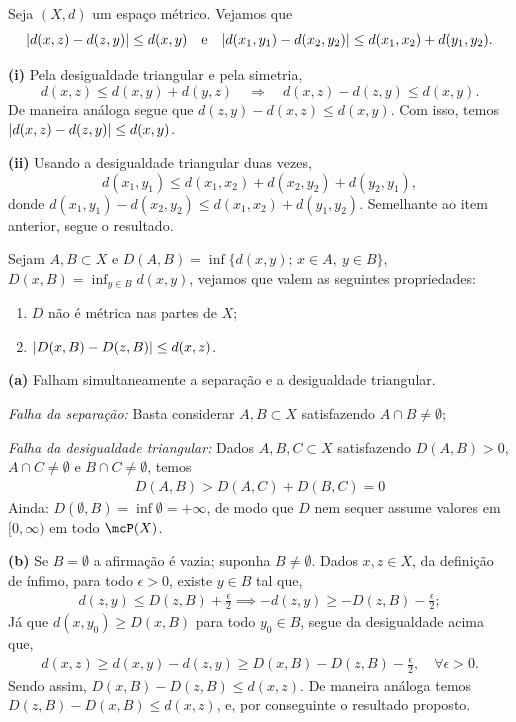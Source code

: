 \vspace{4mm}
\begin{exercicio}{Seja $(X,d)$ um espaço métrico. Vejamos que 
$$\lvert d(x,z)-d(z,y)\rvert\le d(x,y) 
\quad \text{e}\quad \lvert d(x_1,y_1)-d(x_2,y_2)\rvert\le d(x_1,x_2)+d(y_1,y_2).$$}

\textbf{(i)} Pela desigualdade triangular e pela simetria,
\[ d(x,z) \le d(x,y)+d(y,z) \quad\Longrightarrow\quad d(x,z)-d(z,y) \le d(x,y). \]
De maneira análoga segue que $d(z,y)-d(x,z)\le d(x,y)$. Com isso, temos 
$\lvert d(x,z)-d(z,y)\rvert\le d(x,y)$.

\textbf{(ii)} Usando a desigualdade triangular duas vezes,
\[ d(x_1,y_1) \le d(x_1,x_2)+d(x_2,y_2)+d(y_2,y_1), \]
donde $d(x_1,y_1)-d(x_2,y_2)\le d(x_1,x_2)+d(y_1,y_2)$. Semelhante ao item anterior, 
segue o resultado.
\end{exercicio}

\begin{exercicio}{Sejam $A,B\subset X$ e $D(A,B)=\inf\{d(x,y);\, x\in A,\ y\in B\}$, $D(x,B)=\inf_{y\in B} d(x,y)$, vejamos que 
  valem as seguintes propriedades:
  \begin{enumerate}[label=(\alph*)]
  \item $D$ não é métrica nas partes de $X$;
  \item $\lvert D(x,B)-D(z,B)\rvert\le d(x,z)$. 
\end{enumerate}}
\textbf{(a)} Falham simultaneamente a separação e a desigualdade triangular. 

\emph{Falha da separação:} Basta considerar $A, B \subset X$ satisfazendo $A \cap B \neq \emptyset$;

\emph{Falha da desigualdade triangular:} Dados $A, B, C \subset X$ satisfazendo
  $D(A, B) > 0$, $A \cap C \neq \emptyset$ e $B \cap C \neq \emptyset$,
temos 
\begin{align*}
  D(A, B) > D(A, C) + D(B, C) = 0
\end{align*}
Ainda: $D(\emptyset,B)=\inf\emptyset=+\infty$, de modo que $D$ nem sequer assume valores em $[0,\infty)$ em todo $\mcP(X)$.

\textbf{(b)} Se $B=\emptyset$ a afirmação é vazia; suponha $B\neq\emptyset$. Dados $x, z \in X$,
    da definição de ínfimo, para todo $\epsilon>0$, 
existe $y \in B$ tal que, 
\begin{align*}
  d(z, y) \le D(z, B) + \frac{\epsilon}{2} \implies -d(z, y) \ge -D(z, B) - \frac{\epsilon}{2};
\end{align*}
  Já que $d(x, y_0) \ge D(x, B)$ para todo $y_0 \in B$, segue da desigualdade acima que,
\begin{align*}
  d(x, z) \ge d(x, y) - d(z, y) \ge D(x, B) - D(z, B) - \frac{\epsilon}{2}, \quad \forall \epsilon>0.
\end{align*}
  Sendo assim, $D(x, B) - D(z, B) \le d(x, z)$. De maneira análoga temos $D(z, B) - D(x, B) \le d(x, z)$, e, por conseguinte 
  o resultado proposto.
\end{exercicio}

